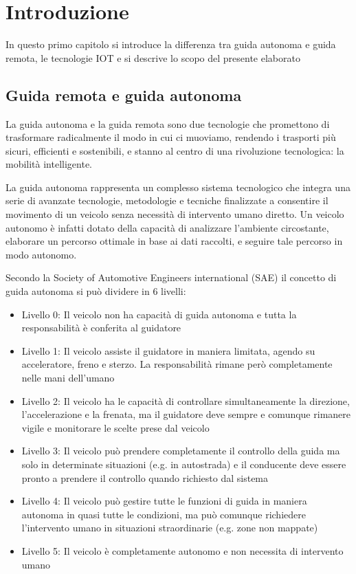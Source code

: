 \chapter{Introduzione} \label{introduzione}
In questo primo capitolo si introduce la differenza tra guida autonoma e guida remota, le tecnologie IOT e si descrive lo scopo del presente elaborato

\section{Guida remota e guida autonoma}
La guida autonoma e la guida remota sono due tecnologie che promettono di trasformare radicalmente il modo in cui ci muoviamo, rendendo i trasporti più sicuri, efficienti e sostenibili, e stanno al centro di una rivoluzione tecnologica: la mobilità intelligente.

\noindent La guida autonoma rappresenta un complesso sistema tecnologico che integra una serie di avanzate tecnologie, metodologie e tecniche finalizzate a consentire il movimento di un veicolo senza necessità di intervento umano diretto. Un veicolo autonomo è infatti dotato della capacità di analizzare l'ambiente circostante, elaborare un percorso ottimale in base ai dati raccolti, e seguire tale percorso in modo autonomo. 

\noindent Secondo la Society of Automotive Engineers international (SAE)\cite{SAE_autonomous_vehicle} il concetto di guida autonoma si può dividere in 6 livelli:

\begin{itemize}
  \item Livello 0: Il veicolo non ha capacità di guida autonoma e tutta la responsabilità è conferita al guidatore  
  \item Livello 1: Il veicolo assiste il guidatore in maniera limitata, agendo su acceleratore, freno e sterzo. La responsabilità rimane però completamente nelle mani dell'umano 
  \item Livello 2: Il veicolo ha le capacità di controllare simultaneamente la direzione, l'accelerazione e la frenata, ma il guidatore deve sempre e comunque rimanere vigile e monitorare le scelte prese dal veicolo
  \item Livello 3: Il veicolo può prendere completamente il controllo della guida ma solo in determinate situazioni (e.g. in autostrada) e il conducente deve essere pronto a prendere il controllo quando richiesto dal sistema
  \item Livello 4: Il veicolo può gestire tutte le funzioni di guida in maniera autonoma in quasi tutte le condizioni, ma può comunque richiedere l'intervento umano in situazioni straordinarie (e.g. zone non mappate)
  \item Livello 5: Il veicolo è completamente autonomo e non necessita di intervento umano
\end{itemize}

